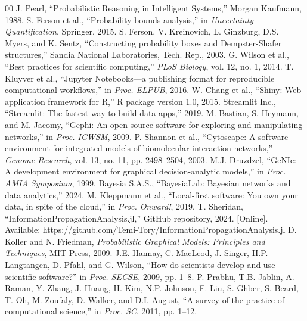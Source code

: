 \documentclass[conference]{IEEEtran}
\begin{document}
\begin{thebibliography}{00}
 J. Pearl, ``Probabilistic Reasoning in Intelligent Systems,'' Morgan Kaufmann, 1988.
 S. Ferson et al., ``Probability bounds analysis,'' in \textit{Uncertainty Quantification}, Springer, 2015.
 S. Ferson, V. Kreinovich, L. Ginzburg, D.S. Myers, and K. Sentz, ``Constructing probability boxes and Dempster-Shafer structures,'' Sandia National Laboratories, Tech. Rep., 2003.
 G. Wilson et al., ``Best practices for scientific computing,'' \textit{PLoS Biology}, vol. 12, no. 1, 2014.
 T. Kluyver et al., ``Jupyter Notebooks---a publishing format for reproducible computational workflows,'' in \textit{Proc. ELPUB}, 2016.
 W. Chang et al., ``Shiny: Web application framework for R,'' R package version 1.0, 2015.
 Streamlit Inc., ``Streamlit: The fastest way to build data apps,'' 2019.
 M. Bastian, S. Heymann, and M. Jacomy, ``Gephi: An open source software for exploring and manipulating networks,'' in \textit{Proc. ICWSM}, 2009.
 P. Shannon et al., ``Cytoscape: A software environment for integrated models of biomolecular interaction networks,'' \textit{Genome Research}, vol. 13, no. 11, pp. 2498--2504, 2003.
 M.J. Druzdzel, ``GeNIe: A development environment for graphical decision-analytic models,'' in \textit{Proc. AMIA Symposium}, 1999.
 Bayesia S.A.S., ``BayesiaLab: Bayesian networks and data analytics,'' 2024.
 M. Kleppmann et al., ``Local-first software: You own your data, in spite of the cloud,'' in \textit{Proc. Onward!}, 2019.
 T. Sheridan, ``InformationPropagationAnalysis.jl,'' GitHub repository, 2024. [Online]. Available: https://github.com/Temi-Tory/InformationPropagationAnalysis.jl
 D. Koller and N. Friedman, \textit{Probabilistic Graphical Models: Principles and Techniques}, MIT Press, 2009.
 J.E. Hannay, C. MacLeod, J. Singer, H.P. Langtangen, D. Pfahl, and G. Wilson, ``How do scientists develop and use scientific software?'' in \textit{Proc. SECSE}, 2009, pp. 1--8.
 P. Prabhu, T.B. Jablin, A. Raman, Y. Zhang, J. Huang, H. Kim, N.P. Johnson, F. Liu, S. Ghber, S. Beard, T. Oh, M. Zoufaly, D. Walker, and D.I. August, ``A survey of the practice of computational science,'' in \textit{Proc. SC}, 2011, pp. 1--12.

\end{thebibliography}
\end{document}
